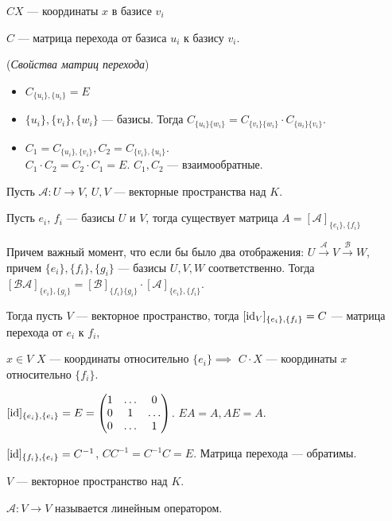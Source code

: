 $CX$ --- координаты $x$ в базисе $v_i$

$C$ --- матрица перехода от базиса $u_i$ к базису $v_i$.
\begin{remark}(\textit{Свойства матриц перехода})
\begin{itemize}
    \item $C_{\{u_i\}, \{u_i\}} = E$
    \item $\{u_i\}, \{v_i\}, \{w_i\}$ --- базисы. Тогда $C_{\{u_i\}\{w_i\}} = C_{\{v_i\}\{w_i\}} \cdot C_{\{u_i\}\{v_i\}}$.
    \item  $C_1 = C_{\{u_i\}, \{v_i\}}, C_2 = C_{\{v_i\}, \{u_i\}}$. \\
        $C_1 \cdot C_2 = C_2 \cdot C_1 = E$. $C_1, C_2$ --- взаимообратные.
\end{itemize}
\end{remark}

Пусть $\mathcal{A}\!: U \to V$,  $U, V$ --- векторные пространства над  $K$.

Пусть  $e_i$,  $f_i$ --- базисы $U$ и  $V$, тогда существует матрица  $A = [\mathcal{A}]_{\{e_i\}, \{f_i\}}$

Причем важный момент, что если бы было два отображения:  $U \xrightarrow{\mathcal{A}} V \xrightarrow{\mathcal{B}} W$, причем  $\{e_i\}, \{f_i\}, \{g_i\}$ --- базисы  $U, V, W$ соответственно.  Тогда  $[\mathcal{B}\mathcal{A}]_{\{e_i\}, \{g_i\}} = [\mathcal{B}]_{\{f_i\} \{g_i\} } \cdot [\mathcal{A}]_{\{e_i\}, \{f_i\}}$.

Тогда пусть $V$ --- векторное пространство, тогда  $[\operatorname{id}_V]_{\{e_i\}, \{f_i\}} = C$ --- матрица перехода от $e_i$ к  $f_i$,

$x \in V$  $X$ --- координаты относительно  $\{e_i\} \implies $  $C \cdot X$ --- координаты  $x$ относительно   $\{f_i\}$.

$[\operatorname{id}]_{\{e_i\}, \{e_i\}} = E = \begin{pmatrix} 1 & \ldots & 0 \\ 0 & 1 & \ldots \\ 0 & \ldots & 1 \end{pmatrix}$. $EA = A, AE = A$.

$[\operatorname{id}]_{\{f_i\}, \{e_i\}} = C^{-1}$,  $CC^{-1} = C^{-1}C = E$. Матрица перехода --- обратимы.

\begin{definition}
    $V$ --- векторное пространство над  $K$.

    $\mathcal{A}\!: V \to V$ называется линейным оператором.
\end{definition}

